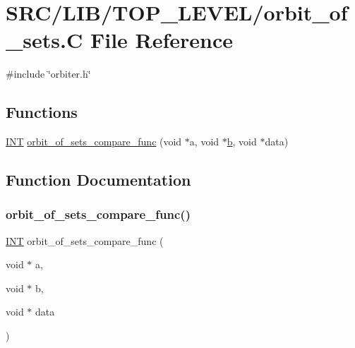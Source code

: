 \hypertarget{orbit__of__sets_8_c}{}\section{S\+R\+C/\+L\+I\+B/\+T\+O\+P\+\_\+\+L\+E\+V\+E\+L/orbit\+\_\+of\+\_\+sets.C File Reference}
\label{orbit__of__sets_8_c}
{\ttfamily \#include \char`\"{}orbiter.\+h\char`\"{}}\newline
\subsection*{Functions}
\begin{DoxyCompactItemize}
\item 
\mbox{\hyperlink{galois_8h_a09fddde158a3a20bd2dcadb609de11dc}{I\+NT}} \mbox{\hyperlink{orbit__of__sets_8_c_adc9a718593fa6560230718e1c24060a1}{orbit\+\_\+of\+\_\+sets\+\_\+compare\+\_\+func}} (void $\ast$a, void $\ast$\mbox{\hyperlink{alphabet2_8_c_a148e3876077787926724625411d6e7a9}{b}}, void $\ast$data)
\end{DoxyCompactItemize}


\subsection{Function Documentation}
\mbox{\label{orbit__of__sets_8_c_adc9a718593fa6560230718e1c24060a1}} 
\subsubsection{\texorpdfstring{orbit\+\_\+of\+\_\+sets\+\_\+compare\+\_\+func()}{orbit\_of\_sets\_compare\_func()}}
{\footnotesize\ttfamily \mbox{\hyperlink{galois_8h_a09fddde158a3a20bd2dcadb609de11dc}{I\+NT}} orbit\+\_\+of\+\_\+sets\+\_\+compare\+\_\+func (\begin{DoxyParamCaption}\item[{void $\ast$}]{a,  }\item[{void $\ast$}]{b,  }\item[{void $\ast$}]{data }\end{DoxyParamCaption})}

